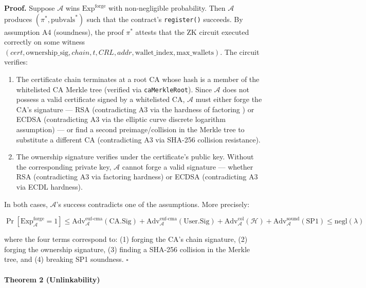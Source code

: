 \documentclass[11pt, a4paper]{article}
\begin{document}
\textbf{Proof.} Suppose \(\mathcal{A}\) wins
\(\text{Exp}^{\text{forge}}\) with non-negligible probability. Then
\(\mathcal{A}\) produces \((\pi^*, \text{pubvals}^*)\) such that the
contract's \texttt{register()} succeeds. By assumption A4 (soundness),
the proof \(\pi^*\) attests that the ZK circuit executed correctly on
some witness
\((cert, \text{ownership\_sig}, chain, t, CRL, addr, \text{wallet\_index}, \text{max\_wallets})\).
The circuit verifies:

\begin{enumerate}
\def\labelenumi{(\alph{enumi})}
\item
  The certificate chain terminates at a root CA whose hash is a member
  of the whitelisted CA Merkle tree (verified via
  \texttt{caMerkleRoot}). Since \(\mathcal{A}\) does not possess a valid
  certificate signed by a whitelisted CA, \(\mathcal{A}\) must either
  forge the CA's signature --- RSA (contradicting A3 via the hardness of
  factoring \cite{ref12}) or ECDSA (contradicting A3 via the elliptic curve
  discrete logarithm assumption) --- or find a second preimage/collision
  in the Merkle tree to substitute a different CA (contradicting A3 via
  SHA-256 collision resistance).
\item
  The ownership signature verifies under the certificate's public key.
  Without the corresponding private key, \(\mathcal{A}\) cannot forge a
  valid signature --- whether RSA (contradicting A3 via factoring
  hardness) or ECDSA (contradicting A3 via ECDL hardness).
\end{enumerate}

In both cases, \(\mathcal{A}\)'s success contradicts one of the
assumptions. More precisely:

\[\Pr[\text{Exp}_{\mathcal{A}}^{\text{forge}} = 1] \leq \text{Adv}_{\mathcal{A}}^{\text{euf-cma}}(\text{CA.Sig}) + \text{Adv}_{\mathcal{A}}^{\text{euf-cma}}(\text{User.Sig}) + \text{Adv}_{\mathcal{A}}^{\text{col}}(\mathcal{H}) + \text{Adv}_{\mathcal{A}}^{\text{sound}}(\text{SP1}) \leq \text{negl}(\lambda)\]

where the four terms correspond to: (1) forging the CA's chain
signature, (2) forging the ownership signature, (3) finding a SHA-256
collision in the Merkle tree, and (4) breaking SP1 soundness.
\(\square\)

\paragraph{Theorem 2 (Unlinkability)}\label{theorem-2-unlinkability}
\end{document}
